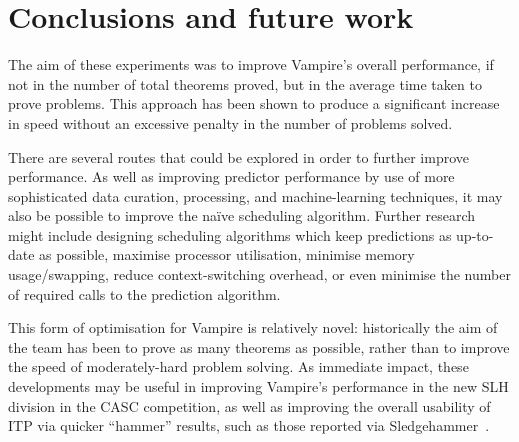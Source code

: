 \documentclass{llncs}
\begin{document}
\section{Conclusions and future work} \label{sec:conclusion}
%
The aim of these experiments was to improve Vampire's overall performance, if not in the number of total theorems proved, but in the average time taken to prove problems.
This approach has been shown to produce a significant increase in speed without an excessive penalty in the number of problems solved.

There are several routes that could be explored in order to further improve performance.
As well as improving predictor performance by use of more sophisticated data curation, processing, and machine-learning techniques, it may also be possible to improve the na\"ive scheduling algorithm.
Further research might include designing scheduling algorithms which keep predictions as up-to-date as possible, maximise processor utilisation, minimise memory usage/swapping, reduce context-switching overhead, or even minimise the number of required calls to the prediction algorithm.

This form of optimisation for Vampire is relatively novel: historically the aim of the team has been to prove as many theorems as possible, rather than to improve the speed of moderately-hard problem solving.
As immediate impact, these developments may be useful in improving Vampire's performance in the new SLH division in the CASC competition, as well as improving the overall usability of ITP via quicker ``hammer'' results, such as those reported via Sledgehammer~\cite{sledgehammer}.



\end{document}
